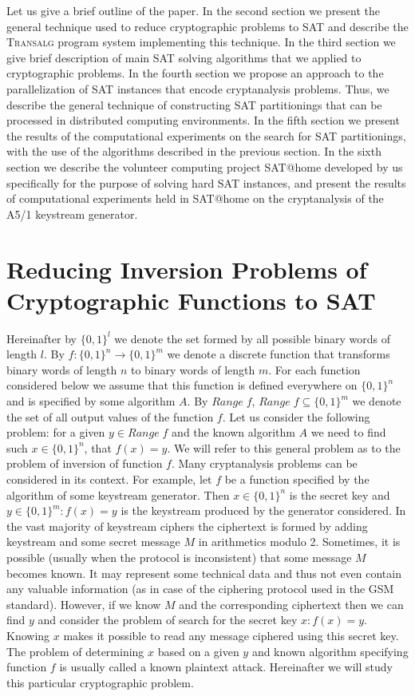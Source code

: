 \documentclass[runningheads,a4paper]{llncs}
\begin{document}
Let us give a brief outline of the paper. In the second section we present the general technique used to reduce cryptographic problems to SAT and describe the \textsc{Transalg} program system implementing this technique. In the third section we give brief description of main SAT solving algorithms that we applied to cryptographic problems. In the fourth section we propose an approach to the parallelization of SAT instances that encode cryptanalysis problems. Thus, we describe the general technique of constructing SAT partitionings that can be processed in distributed computing environments. In the fifth section we present the results of the computational experiments on the search for SAT partitionings, with the use of the algorithms described in the previous section. In the sixth section we describe the volunteer computing project SAT@home developed by us specifically for the purpose of solving hard SAT instances, and present the results of computational experiments held in SAT@home on the cryptanalysis of the A5/1 keystream generator.

\section{Reducing Inversion Problems of Cryptographic Functions to SAT}

Hereinafter by $\{0,1\}^l$ we denote the set formed by all possible binary words of length $l$. By $f:\{0,1\}^n\rightarrow\{0,1\}^m$ we denote a discrete function that transforms binary words of length $n$ to binary words of length $m$. For each function considered below we assume that this function is defined everywhere on $\{0,1\}^n$ and is specified by some algorithm $A$. By $Range\;f$, $Range\;f\subseteq\{0,1\}^m$ we denote the set of all output values of the function $f$. Let us consider the following problem: for a given $y\in Range\;f$ and the known algorithm $A$ we need to find such $x\in\{0,1\}^n$, that $f(x)=y$. We will refer to this general problem as to the problem of inversion of function $f$. Many cryptanalysis problems can be considered in its context. For example, let $f$ be a function specified by the algorithm of some keystream generator. Then $x\in\{0,1\}^n$ is the secret key and $y\in\{0,1\}^m:f(x)=y$ is the keystream produced by the generator considered. In the vast majority of keystream ciphers the ciphertext is formed by adding keystream and some secret message $M$ in arithmetics modulo 2. Sometimes, it is possible (usually when the protocol is inconsistent) that some message $M$ becomes known. It may represent some technical data and thus not even contain any valuable information (as in case of the ciphering protocol used in the GSM standard). However, if we know $M$ and the corresponding ciphertext then we can find $y$ and consider the problem of search for the secret key $x:f(x)=y$. Knowing $x$ makes it possible to read any message ciphered using this secret key. The problem of determining $x$ based on a given $y$ and known algorithm specifying function $f$ is usually called a known plaintext attack. Hereinafter we will study this particular cryptographic problem.
\end{document}
